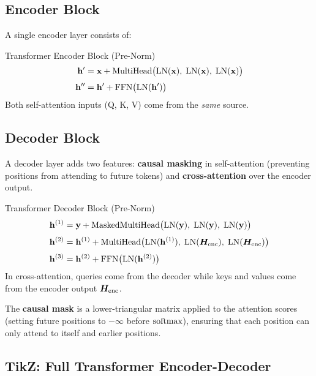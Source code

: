 \subsection{Encoder Block}

A single encoder layer consists of:

\begin{mathresult}{Transformer Encoder Block (Pre-Norm)}
\begin{align*}
    \mathbf{h}' &= \mathbf{x} + \text{MultiHead}\bigl(\text{LN}(\mathbf{x}),\; \text{LN}(\mathbf{x}),\; \text{LN}(\mathbf{x})\bigr) \\[3pt]
    \mathbf{h}'' &= \mathbf{h}' + \text{FFN}\bigl(\text{LN}(\mathbf{h}')\bigr)
\end{align*}
Both self-attention inputs (Q, K, V) come from the \emph{same} source.
\end{mathresult}

\subsection{Decoder Block}

A decoder layer adds two features: \textbf{causal masking} in self-attention
(preventing positions from attending to future tokens) and \textbf{cross-attention}
over the encoder output.

\begin{mathresult}{Transformer Decoder Block (Pre-Norm)}
\begin{align*}
    \mathbf{h}^{(1)} &= \mathbf{y} + \text{MaskedMultiHead}\bigl(\text{LN}(\mathbf{y}),\; \text{LN}(\mathbf{y}),\; \text{LN}(\mathbf{y})\bigr) \\[3pt]
    \mathbf{h}^{(2)} &= \mathbf{h}^{(1)} + \text{MultiHead}\bigl(\text{LN}(\mathbf{h}^{(1)}),\; \text{LN}(\bm{H}_{\text{enc}}),\; \text{LN}(\bm{H}_{\text{enc}})\bigr) \\[3pt]
    \mathbf{h}^{(3)} &= \mathbf{h}^{(2)} + \text{FFN}\bigl(\text{LN}(\mathbf{h}^{(2)})\bigr)
\end{align*}
In cross-attention, queries come from the decoder while keys and values come from the encoder output $\bm{H}_{\text{enc}}$.
\end{mathresult}

The \textbf{causal mask} is a lower-triangular matrix applied to the attention
scores (setting future positions to $-\infty$ before $\operatorname{softmax}$), ensuring that
each position can only attend to itself and earlier positions.

\subsection{TikZ: Full Transformer Encoder-Decoder}

